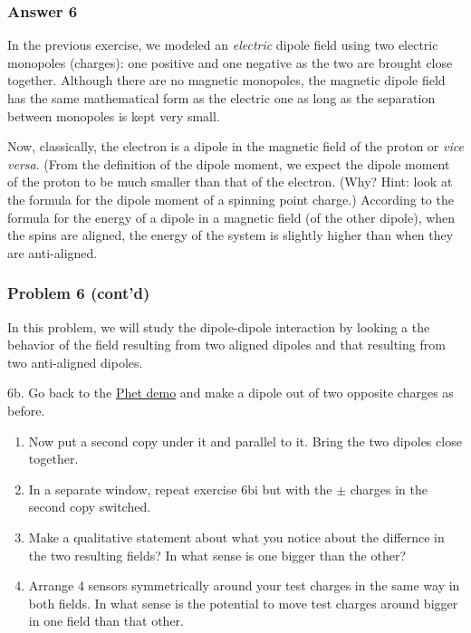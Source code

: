 \documentclass[11pt]{article}
\begin{document}
     
\subsubsection{Answer 6}\label{answer-6}

 

    In the previous exercise, we modeled an \emph{electric} dipole field
using two electric monopoles (charges): one positive and one negative as
the two are brought close together. Although there are no magnetic
monopoles, the magnetic dipole field has the same mathematical form as
the electric one as long as the separation between monopoles is kept
very small.

Now, classically, the electron is a dipole in the magnetic field of the
proton or \emph{vice versa}. (From the definition of the dipole moment,
we expect the dipole moment of the proton to be much smaller than that
of the electron. (Why? Hint: look at the formula for the dipole moment
of a spinning point charge.) According to the formula for the energy of
a dipole in a magnetic field (of the other dipole), when the spins are
aligned, the energy of the system is slightly higher than when they are
anti-aligned.

\subsubsection{Problem 6 (cont'd)}\label{problem-6-contd}

In this problem, we will study the dipole-dipole interaction by looking
a the behavior of the field resulting from two aligned dipoles and that
resulting from two anti-aligned dipoles.

6b. Go back to the
\href{https://demo-clix.tiss.ac.in/phet/sims/html/charges-and-fields/latest/charges-and-fields_all.html?locale=en}{Phet
demo} and make a dipole out of two opposite charges as before.

\begin{enumerate}
\def\labelenumi{\roman{enumi}.}
\item
  Now put a second copy under it and parallel to it. Bring the two
  dipoles close together.
\item
  In a separate window, repeat exercise 6bi but with the \(\pm\) charges
  in the second copy switched.
\item
  Make a qualitative statement about what you notice about the differnce
  in the two resulting fields? In what sense is one bigger than the
  other?
\item
  Arrange 4 sensors symmetrically around your test charges in the same
  way in both fields. In what sense is the potential to move test
  charges around bigger in one field than that other.
\end{enumerate}
\end{document}
